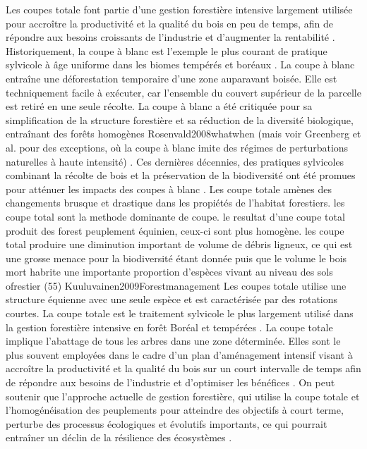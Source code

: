 Les coupes totale font partie d'une gestion forestière intensive largement utilisée pour accroître la productivité et la qualité du bois en peu de temps, afin de répondre aux besoins croissants de l'industrie et d'augmenter la rentabilité \citep{Irland2011TimberProductivitya}.
Historiquement, la coupe à blanc est l'exemple le plus courant de pratique sylvicole à âge uniforme dans les biomes tempérés et boréaux \citep{Fedrowitz2014Canretention}. 
La coupe à blanc entraîne une déforestation temporaire d'une zone auparavant boisée.
Elle est techniquement facile à exécuter, car l'ensemble du couvert supérieur de la parcelle est retiré en une seule récolte. 
La coupe à blanc a été critiquée pour sa simplification de la structure forestière et sa réduction de la diversité biologique, entraînant des forêts homogènes Rosenvald2008whatwhen \citep{Rosenvald2008whatwhen} (mais voir Greenberg et al. pour des exceptions, où la coupe à blanc imite des régimes de perturbations naturelles à haute intensité) \citep{Greenberg1995comparisonbird}. 
Ces dernières décennies, des pratiques sylvicoles combinant la récolte de bois et la préservation de la biodiversité ont été promues pour atténuer les impacts des coupes à blanc \citep{Gustafsson2012Retentionforestry}.
Les coupe totale amènes des changements brusque et drastique dans les propiétés de l'habitat forestiers.
les coupe total sont la methode dominante de coupe. le resultat d'une coupe total produit des forest peuplement équinien, ceux-ci sont plus homogène.
les coupe total produire une diminution important de volume de débris ligneux, ce qui est une grosse menace pour la biodiversité étant donnée puis que le volume le bois mort habrite une importante proportion d'espèces vivant au niveau des sols ofrestier (55) Kuuluvainen2009Forestmanagement
Les coupes totale utilise une structure équienne avec une seule espèce et est caractérisée par des rotations courtes. 
La coupe totale est le traitement sylvicole le plus largement utilisé dans la gestion forestière intensive en forêt Boréal et tempérées \citep{Ameray2021Forestcarbon}. 
La coupe totale implique l'abattage de tous les arbres dans une zone déterminée.
Elles sont le plus souvent employées dans le cadre d'un plan d'aménagement intensif visant à accroître la productivité et la qualité du bois 
sur un court intervalle de temps afin de répondre aux besoins de l'industrie et d'optimiser les bénéfices \citep{Ameray2021Forestcarbon}.
On peut soutenir que l'approche actuelle de gestion forestière, qui utilise la coupe totale et l'homogénéisation des peuplements pour atteindre des objectifs à court terme, perturbe des processus écologiques et évolutifs importants, ce qui pourrait entraîner un déclin de la résilience des écosystèmes \citep{Holling2001UnderstandingComplexity}. 

